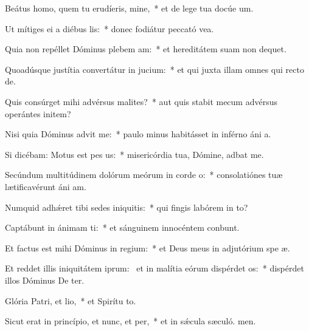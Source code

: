 \item Beátus homo, quem tu erudíeris, mine,~* et de lege tua docúe um.
\item Ut mítiges ei a diébus lis:~* donec fodiátur peccató vea.
\item Quia non repéllet Dóminus plebem am:~* et hereditátem suam non dequet.
\item Quoadúsque justítia convertátur in jucium:~* et qui juxta illam omnes qui recto  de.
\item Quis consúrget mihi advérsus malites?~* aut quis stabit mecum advérsus operántes initem?
\item Nisi quia Dóminus advit me:~* paulo minus habitásset in inférno áni a.
\item Si dicébam: Motus est pes us:~* misericórdia tua, Dómine, adbat me.
\item Secúndum multitúdinem dolórum meórum in corde o:~* consolatiónes tuæ lætificavérunt áni am.
\item Numquid adhǽret tibi sedes iniquitis:~* qui fingis labórem in to?
\item Captábunt in ánimam ti:~* et sánguinem innocéntem conbunt.
\item Et factus est mihi Dóminus in regium:~* et Deus meus in adjutórium spe æ.
\item Et reddet illis iniquitátem iprum:~\pscross{} et in malítia eórum dispérdet os:~* dispérdet illos Dóminus De ter.
\item Glória Patri, et lio,~* et Spirítu to.
\item Sicut erat in princípio, et nunc, et per,~* et in sǽcula sæculó. men.
